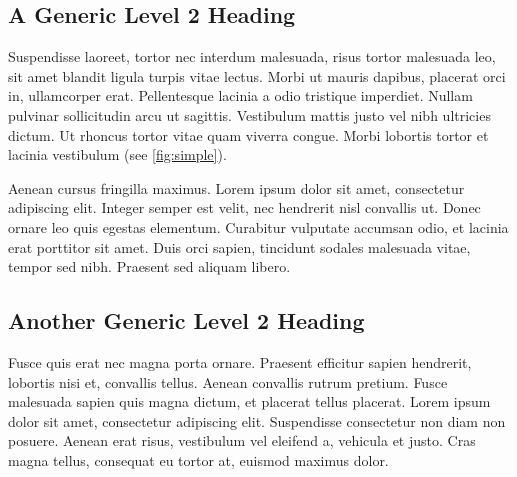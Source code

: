 \documentclass[
    colorlinks=true,        %
    linkcolor=black,          %
    anchorcolor=black,      %
    citecolor=black,         %
    urlcolor=black,          %
    bookmarks=true,         %
    bookmarksopen=false,    %
    bookmarksnumbered=true,  %
    dvipsnames
]{MAE}
\begin{document}
\subsection{A Generic Level 2 Heading}

Suspendisse laoreet, tortor nec interdum malesuada, risus tortor malesuada leo, sit amet blandit ligula turpis vitae lectus. Morbi ut mauris dapibus, placerat orci in, ullamcorper erat. Pellentesque lacinia a odio tristique imperdiet. Nullam pulvinar sollicitudin arcu ut sagittis. Vestibulum mattis justo vel nibh ultricies dictum. Ut rhoncus tortor vitae quam viverra congue. Morbi lobortis tortor et lacinia vestibulum (see \cref{fig:simple}).


Aenean cursus fringilla maximus. Lorem ipsum dolor sit amet, consectetur adipiscing elit. Integer semper est velit, nec hendrerit nisl convallis ut. Donec ornare leo quis egestas elementum. Curabitur vulputate accumsan odio, et lacinia erat porttitor sit amet. Duis orci sapien, tincidunt sodales malesuada vitae, tempor sed nibh. Praesent sed aliquam libero.

\subsection{Another Generic Level 2 Heading}

Fusce quis erat nec magna porta ornare. Praesent efficitur sapien hendrerit, lobortis nisi et, convallis tellus. Aenean convallis rutrum pretium. Fusce malesuada sapien quis magna dictum, et placerat tellus placerat. Lorem ipsum dolor sit amet, consectetur adipiscing elit. Suspendisse consectetur non diam non posuere. Aenean erat risus, vestibulum vel eleifend a, vehicula et justo. Cras magna tellus, consequat eu tortor at, euismod maximus dolor.
\end{document}
